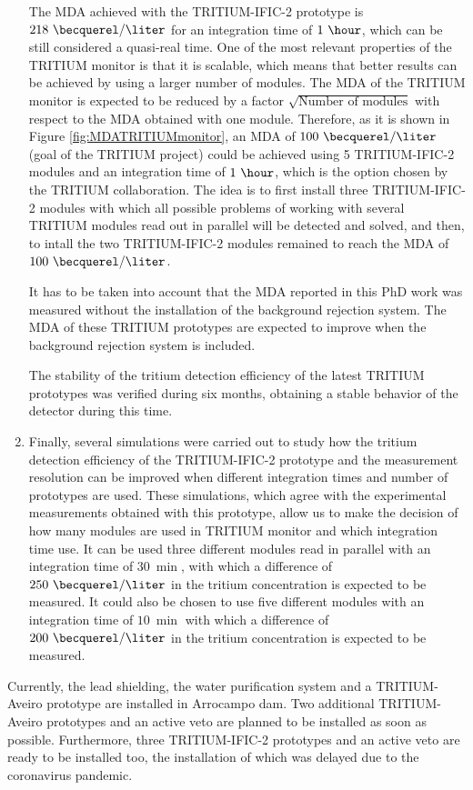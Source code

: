 \begin{enumerate}
\begin{itemize}
\end{itemize}

The MDA achieved with the TRITIUM-IFIC-2 prototype is $218~\becquerel/\liter$ for an integration time of $1~\hour$, which can be still considered a quasi-real time. One of the most relevant properties of the TRITIUM monitor is that it is scalable, which means that better results can be achieved by using a larger number of modules. The MDA of the TRITIUM monitor is expected to be reduced by a factor $\sqrt{\text{Number of modules}}$ with respect to the MDA obtained with one module. Therefore, as it is shown in Figure \ref{fig:MDATRITIUMmonitor}, an MDA of  $100~\becquerel/\liter$ (goal of the TRITIUM project) could be achieved using 5 TRITIUM-IFIC-2 modules and an integration time of $1~\hour$, which is the option chosen by the TRITIUM collaboration. The idea is to first install three TRITIUM-IFIC-2 modules with which all possible problems of working with several TRITIUM modules read out in parallel will be detected and solved, and then, to intall the two TRITIUM-IFIC-2 modules remained to reach the MDA of $100~\becquerel/\liter$.

It has to be taken into account that the MDA reported in this PhD work was measured without the installation of the background rejection system. The MDA of these TRITIUM prototypes are expected to improve when the background rejection system is included.

The stability of the tritium detection efficiency of the latest TRITIUM prototypes was verified during six months, obtaining a stable behavior of the detector during this time.

\item{} Finally, several simulations were carried out to study how the tritium detection efficiency of the TRITIUM-IFIC-2 prototype and the measurement resolution can be improved when different integration times and number of prototypes are used. These simulations, which agree with the experimental measurements obtained with this prototype, allow us to make the decision of how many modules are used in TRITIUM monitor and which integration time use. It can be used three different modules read in parallel with an integration time of $30~\min$, with which a difference of $250~\becquerel/\liter$ in the tritium concentration is expected to be measured. It could also be chosen to use five different modules with an integration time of $10~\min$ with which a difference of $200~\becquerel/\liter$ in the tritium concentration is expected to be measured.

\end{enumerate}

Currently, the lead shielding, the water purification system and a TRITIUM-Aveiro prototype are installed in Arrocampo dam. Two additional TRITIUM-Aveiro prototypes and an active veto are planned to be installed as soon as possible. Furthermore, three TRITIUM-IFIC-2 prototypes and an active veto are ready to be installed too, the installation of which was delayed due to the coronavirus pandemic.